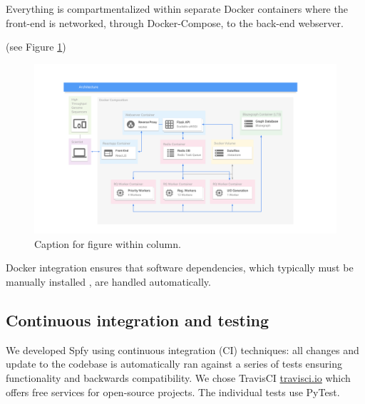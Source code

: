 \documentclass[a4,center,fleqn]{NAR}
\begin{document}


Everything is compartmentalized within separate Docker containers where the front-end is networked, through Docker-Compose, to the back-end webserver.

(see Figure \ref{fig-docker})

\begin{figure}[t]
\begin{center}
\includegraphics{images/docker.svg}
\end{center}
\caption{Caption for figure within column.}
\label{fig-docker}
\end{figure}

Docker integration ensures that software dependencies, which typically must be manually installed \cite{doi:10.1093/bioinformatics/btu153,laing2010pan,inouye2014srst2,naccache2014cloud}, are handled automatically.


\subsection{Continuous integration and testing}

We developed Spfy using continuous integration (CI) techniques: all changes and update to the codebase is automatically ran against a series of tests ensuring functionality and backwards compatibility.
We chose TravisCI \url{travisci.io} which offers free services for open-source projects.
The individual tests use PyTest.
\end{document}
